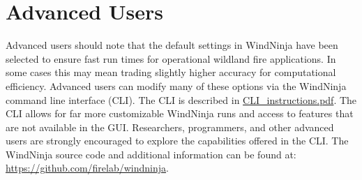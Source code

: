\documentclass[12pt]{article}
\begin{document}
\section{Advanced Users}

Advanced users should note that the default settings in WindNinja have been selected to ensure fast run times for operational wildland fire applications. In some cases this may mean trading slightly higher accuracy for computational efficiency.  Advanced users can modify many of these options via the WindNinja command line interface (CLI). The CLI is described in \href{https://weather.firelab.org/windninja/tutorials/CLI_instructions.pdf}{CLI\_instructions.pdf}. The CLI allows for far more customizable WindNinja runs and access to features that are not available in the GUI. Researchers, programmers, and other advanced users are strongly encouraged to explore the capabilities offered in the CLI. The WindNinja source code and additional information can be found at: \url{https://github.com/firelab/windninja}.
\end{document}
